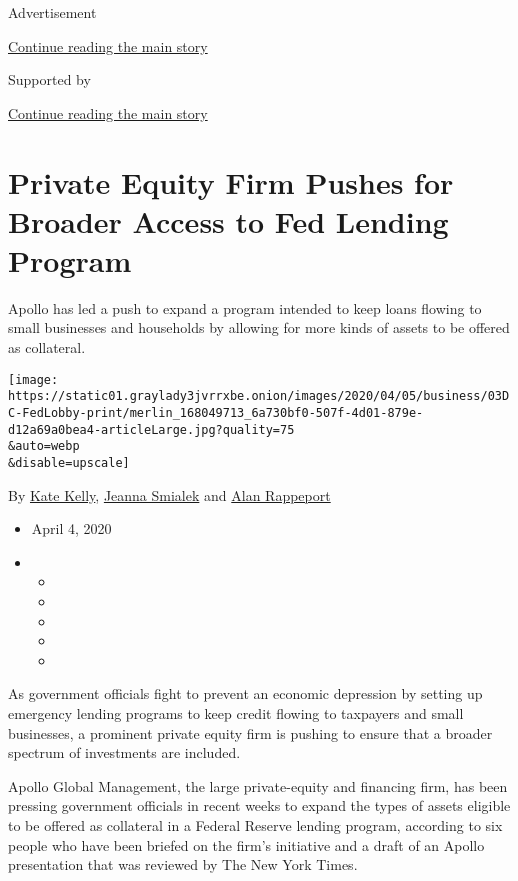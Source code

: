 Advertisement

\protect\hyperlink{after-top}{Continue reading the main story}

Supported by

\protect\hyperlink{after-sponsor}{Continue reading the main story}

\hypertarget{private-equity-firm-pushes-for-broader-access-to-fed-lending-program}{%
\section{Private Equity Firm Pushes for Broader Access to Fed Lending
Program}\label{private-equity-firm-pushes-for-broader-access-to-fed-lending-program}}

Apollo has led a push to expand a program intended to keep loans flowing
to small businesses and households by allowing for more kinds of assets
to be offered as collateral.

\texttt{[image: https://static01.graylady3jvrrxbe.onion/images/2020/04/05/business/03DC-FedLobby-print/merlin\_168049713\_6a730bf0-507f-4d01-879e-d12a69a0bea4-articleLarge.jpg?quality=75\\\&auto=webp\\\&disable=upscale]}

By \href{https://www.nytimes3xbfgragh.onion/by/kate-kelly}{Kate Kelly},
\href{https://www.nytimes3xbfgragh.onion/by/jeanna-smialek}{Jeanna
Smialek} and
\href{https://www.nytimes3xbfgragh.onion/by/alan-rappeport}{Alan
Rappeport}

\begin{itemize}
\item
  April 4, 2020
\item
  \begin{itemize}
  \item
  \item
  \item
  \item
  \item
  \end{itemize}
\end{itemize}

As government officials fight to prevent an economic depression by
setting up emergency lending programs to keep credit flowing to
taxpayers and small businesses, a prominent private equity firm is
pushing to ensure that a broader spectrum of investments are included.

Apollo Global Management, the large private-equity and financing firm,
has been pressing government officials in recent weeks to expand the
types of assets eligible to be offered as collateral in a Federal
Reserve lending program, according to six people who have been briefed
on the firm's initiative and a draft of an Apollo presentation that was
reviewed by The New York Times.

